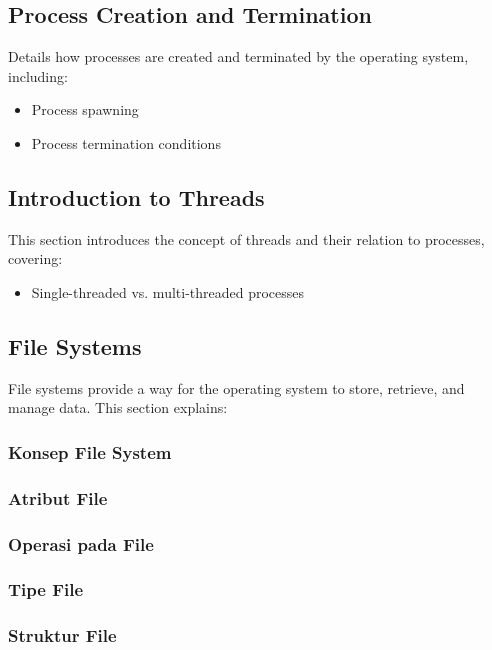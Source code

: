 \documentclass[12pt]{article}
\begin{document}
\subsection{Process Creation and Termination}
Details how processes are created and terminated by the operating system, including:
\begin{itemize}
    \item Process spawning
    \item Process termination conditions
\end{itemize}

\subsection{Introduction to Threads}
This section introduces the concept of threads and their relation to processes, covering:
\begin{itemize}
    \item Single-threaded vs. multi-threaded processes
\end{itemize}
\subsection{File Systems}
File systems provide a way for the operating system to store, retrieve, and manage data. This section explains:
\subsubsection{Konsep File System}
\subsubsection{Atribut File}
\subsubsection{Operasi pada File}
\subsubsection{Tipe File}
\subsubsection{Struktur File}
\end{document}
